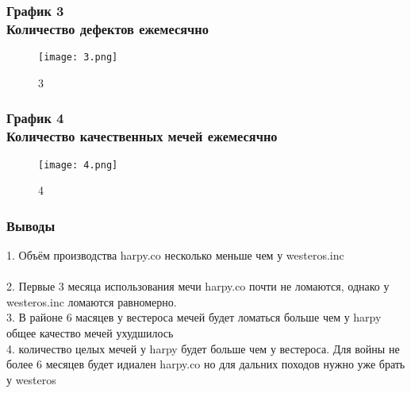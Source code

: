\documentclass[8pt]{beamer}
\begin{document}
\begin{frame}
\frametitle{График 3\\ {\small Количество дефектов ежемесячно}}
\begin{figure}[h]
		\texttt{[image: 3.png]}
		\caption{3}
		\label{Third}
\end{figure}



\end{frame}


\begin{frame}
\frametitle{График 4\\ {\small Количество качественных мечей ежемесячно}}
\begin{figure}[h]
		\texttt{[image: 4.png]}
		\caption{4}
		\label{Fourth}
\end{figure}
\end{frame}

\begin{frame}
\frametitle{Выводы}
1. Объём производства harpy.co несколько меньше чем у westeros.inc\\
\\
2. Первые 3 месяца использования мечи harpy.co почти не ломаются, однако у westeros.inc ломаются равномерно.\\
3. В районе 6 масяцев у вестероса мечей будет ломаться больше чем у harpy\\
общее качество мечей ухудшилось\\
4. количество целых мечей у harpy будет больше чем у вестероса.
Для войны не более 6 месяцев будет идиален harpy.co
но для дальних походов нужно уже брать у westeros
\end{frame}
\end{document}
